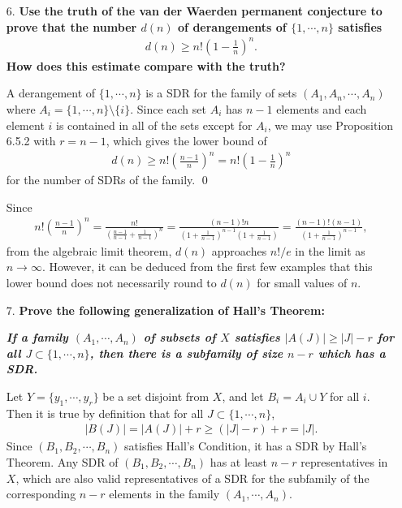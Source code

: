 \documentclass[a4paper,12pt]{article}
\begin{document}
\begin{enumerate}
    \item[6.]
        \boldmath
        \textbf{Use the truth of the van der Waerden permanent conjecture to prove that the number $d(n)$ of derangements of $\{ 1, \cdots, n \}$ satisfies
            \begin{align*}
                d(n) \geq n! \left( 1 - \frac{1}{n} \right)^n.
            \end{align*}
        How does this estimate compare with the truth?} \par
        \unboldmath
        A derangement of $\{ 1, \cdots, n \}$ is a SDR for the family of sets $(A_1, A_n, \cdots, A_n)$ where $A_i = \{ 1, \cdots, n \} \setminus \{ i \}$. Since each set $A_i$ has $n - 1$ elements and each element $i$ is contained in all of the sets except for $A_i$, we may use Proposition 6.5.2 with $r = n - 1$, which gives the lower bound of
        \begin{align*}
            d(n) \geq n! \left( \frac{n - 1}{n} \right)^n = n! \left( 1 - \frac{1}{n} \right)^n
        \end{align*}
        for the number of SDRs of the family. \qed \par
        Since
        \begin{align*}
            n! \left( \frac{n - 1}{n} \right)^n = \frac{n!}{\left( \frac{n - 1}{n - 1} + \frac{1}{n - 1} \right)^n} = \frac{(n - 1)! n}{\left( 1 + \frac{1}{n - 1} \right)^{n - 1} \left( 1 + \frac{1}{n - 1} \right)} = \frac{(n - 1)!(n - 1)}{\left( 1 + \frac{1}{n - 1} \right)^{n - 1}},
        \end{align*}
        from the algebraic limit theorem, $d(n)$ approaches $n!/e$ in the limit as $n \to \infty$. However, it can be deduced from the first few examples that this lower bound does not necessarily round to $d(n)$ for small values of $n$.

    \item[7.]
        \boldmath
        \textbf{Prove the following generalization of Hall's Theorem:} \par
        \begin{adjustwidth}{2.5em}{0pt}
            \textbf{\textit{If a family $(A_1, \cdots, A_n)$ of subsets of $X$ satisfies $|A(J)| \geq |J| - r$ for all $J \subset \{ 1, \cdots, n \}$, then there is a subfamily of size $n - r$ which has a SDR.}}
        \end{adjustwidth} \par
        \unboldmath
        Let $Y = \{ y_1, \cdots, y_r \}$ be a set disjoint from $X$, and let $B_i = A_i \cup Y$ for all $i$. Then it is true by definition that for all $J \subset \{ 1, \cdots, n \}$,
        \begin{align*}
            |B(J)| = |A(J)| + r \geq (|J| - r) + r = |J|.
        \end{align*}
        Since $(B_1, B_2, \cdots, B_n)$ satisfies Hall's Condition, it has a SDR by Hall's Theorem. Any SDR of $(B_1, B_2, \cdots, B_n)$ has at least $n - r$ representatives in $X$, which are also valid representatives of a SDR for the subfamily of the corresponding $n - r$ elements in the family $(A_1, \cdots, A_n)$.
\end{enumerate}
\end{document}
